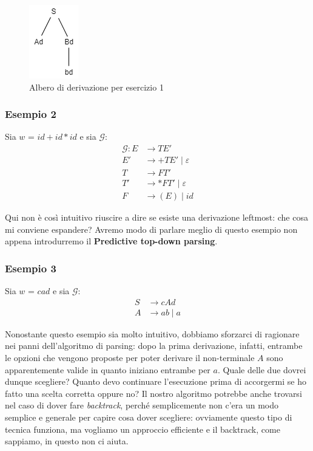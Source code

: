 \documentclass[class=book, crop=false, oneside, 12pt]{standalone}
\begin{document}
\begin{figure}[H]
    \centering
    \includegraphics[width=.15\textwidth,keepaspectratio]{par-td-es1.png}
    \caption{Albero di derivazione per esercizio 1}
    \label{par-td-es1}
\end{figure}

\subsubsection{Esempio 2}
Sia \(w\) = \(id + id * id\) e sia \(\mathcal{G}\):
\begin{align*}
    \mathcal{G}: E &\rightarrow TE' \\
    E' &\rightarrow +TE' \mid \varepsilon \\
    T &\rightarrow FT' \\
    T' &\rightarrow *FT' \mid \varepsilon \\
    F &\rightarrow (E) \mid id
\end{align*}

Qui non è così intuitivo riuscire a dire se esiste una derivazione leftmost: che cosa mi conviene espandere? Avremo modo di parlare meglio di questo esempio non appena introdurremo il \textbf{Predictive top-down parsing}.

\subsubsection{Esempio 3}
Sia \(w\) = \(cad\) e sia \(\mathcal{G}\):
\begin{align*}
    S &\rightarrow cAd \\
    A &\rightarrow ab \mid a
\end{align*}

Nonostante questo esempio sia molto intuitivo, dobbiamo sforzarci di ragionare nei panni dell'algoritmo di parsing: dopo la prima derivazione, infatti, entrambe le opzioni che vengono proposte per poter derivare il non-terminale \(A\) sono apparentemente valide in quanto iniziano entrambe per \(a\). Quale delle due dovrei dunque scegliere? Quanto devo continuare l'esecuzione prima di accorgermi se ho fatto una scelta corretta oppure no? Il nostro algoritmo potrebbe anche trovarsi nel caso di dover fare \emph{backtrack}, perché semplicemente non c'era un modo semplice e generale per capire cosa dover scegliere: ovviamente questo tipo di tecnica funziona, ma vogliamo un approccio efficiente e il backtrack, come sappiamo, in questo non ci aiuta.
\end{document}
